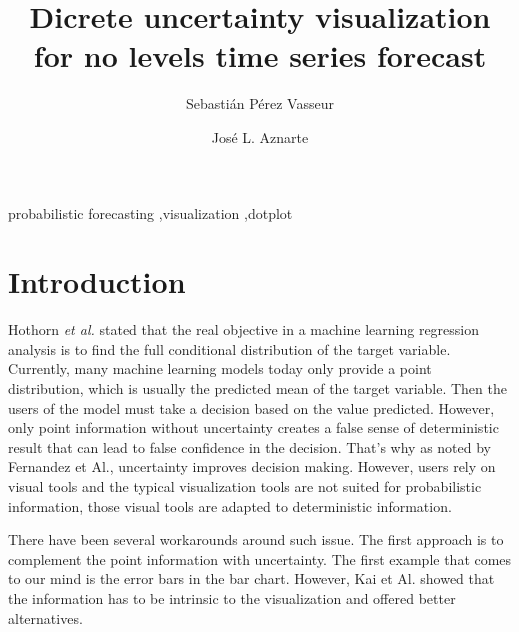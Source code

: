 \documentclass[a4paper,3p,sort&compress]{elsarticle}
\begin{document}
\linenumbers

\newcommand{\no}{NO\textsubscript{2}\xspace}

\begin{frontmatter}

  \title{Dicrete uncertainty visualization for no levels time series forecast}


  \author{Sebasti\'an P\'erez Vasseur}
  \author{Jos\'e L. Aznarte}
  \address{Artificial Intelligence Department\\Universidad Nacional de
    Educaci\'on a Distancia --- UNED\\c/ Juan del Rosal, 16, Madrid, Spain}
  

\begin{abstract}
  
\end{abstract}

\begin{keyword}
probabilistic forecasting \sep visualization \sep dotplot
\end{keyword}

\end{frontmatter}


\section{Introduction}
\label{sec:intro}

Hothorn \emph{et al.} stated that the real
objective in a machine learning regression analysis is to find the full conditional distribution
of the target variable. Currently, many machine learning models today only provide a point distribution, which is usually the predicted
mean of the target variable. Then the users of the model must take a decision based on the value predicted. However, only point information without uncertainty creates a false sense of deterministic result that can lead to false confidence in the decision. That's why as noted by Fernandez et Al., uncertainty improves decision making. However, users rely on visual tools and the typical visualization tools are not suited for probabilistic information, those visual tools are adapted to deterministic information.

There have been several workarounds around such issue. The first approach is to complement the point information with uncertainty. The first example that comes to our mind is the error bars in the bar chart. However, Kai et Al. showed that the information has to be intrinsic to the visualization and offered better alternatives. 
\end{document}
